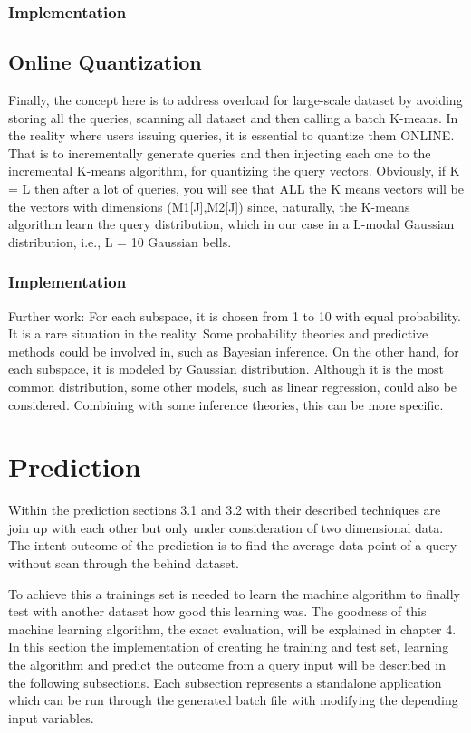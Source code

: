 \documentclass{lmproj}
\begin{document}
\subsubsection{Implementation}





\subsection{Online Quantization}
Finally, the concept here is to address overload for large-scale dataset by avoiding storing all the queries, scanning all dataset and then calling a batch K-means. In the reality where users issuing queries, it is essential to quantize them ONLINE. That is to incrementally generate queries and then injecting each one to the incremental K-means algorithm, for quantizing the query vectors. Obviously, if K = L then after a lot of queries, you will see that ALL the K means vectors will be the vectors with dimensions (M1[J],M2[J]) since, naturally, the K-means algorithm learn the query distribution, which in our case in a L-modal Gaussian distribution, i.e., L = 10 Gaussian bells.

\subsubsection{Implementation}

Further work:
For each subspace, it is chosen from 1 to 10 with equal probability. It is a rare situation in the reality. Some probability theories and predictive methods could be involved in, such as Bayesian inference. On the other hand, for each subspace, it is modeled by Gaussian distribution. Although it is the most common distribution, some other models, such as linear regression, could also be considered. Combining with some inference theories, this can be more specific. 

\clearpage
\section{Prediction}
Within the prediction sections 3.1 and 3.2 with their described techniques are join up with each other but only under consideration of two dimensional data. The intent outcome of the prediction is to find the average data point of a query without scan through the behind dataset. 

To achieve this a trainings set is needed to learn the machine algorithm to finally test with another dataset how good this learning was. The goodness of this machine learning algorithm, the exact evaluation, will be explained in chapter 4. In this section the implementation of creating he training and test set, learning the algorithm and predict the outcome from a query input will be described in the following subsections. Each subsection represents a standalone application which can be run through the generated batch file with modifying the depending input variables. 
\end{document}
